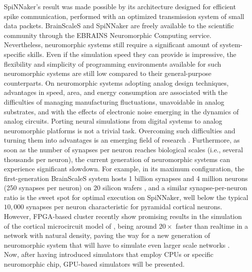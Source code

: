 \documentclass[a4paper, 12pt, twoside, openright]{book}
\begin{document}
SpiNNaker's result was made possible by its architecture designed for efficient spike communication, performed with an optimized transmission system of small data packets. BrainScaleS and SpiNNaker are freely available to the scientific community through the EBRAINS Neuromorphic Computing service.\\
Nevertheless, neuromorphic systems still require a significant amount of system-specific skills. Even if the simulation speed they can provide is impressive, the flexibility and simplicity of programming environments available for such neuromorphic systems are still low compared to their general-purpose counterparts. On neuromorphic systems adopting analog design techniques, advantages in speed, area, and energy consumption are associated with the difficulties of managing manufacturing fluctuations, unavoidable in analog substrates, and with the effects of electronic noise emerging in the dynamics of analog circuits. Porting neural simulations from digital systems to analog neuromorphic platforms is not a trivial task. Overcoming such difficulties and turning them into advantages is an emerging field of research \cite{Wunderlich2019}. Furthermore, as soon as the number of synapses per neuron reaches biological scales (i.e., several thousands per neuron), the current generation of neuromorphic systems can experience significant slowdown. For example, in its maximum configuration, the first-generation BrainScaleS system hosts 1 billion synapses and 4 million neurons (250 synapses per neuron) on 20 silicon wafers \cite{Guttler2017}, and a similar synapse-per-neuron ratio is the sweet spot for optimal execution on SpiNNaker, well below the typical $10,000$ synapses per neuron characteristic for pyramidal cortical neurons. However, FPGA-based cluster recently show promising results in the simulation of the cortical microcircuit model of \cite{Potjans2012}, being around $20\times$ faster than realtime in a network with natural density, paving the way for a new generation of neuromorphic system that will have to simulate even larger scale networks \cite{Kauth2023}.\\
Now, after having introduced simulators that employ CPUs or specific neuromorphic chip, GPU-based simulators will be presented.
\end{document}
